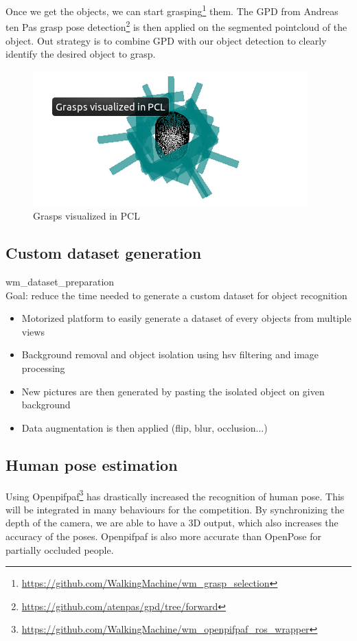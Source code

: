 \documentclass[runningheads,a4paper]{llncs}
\begin{document}
Once we get the objects, we can start grasping\footnote{\url{https://github.com/WalkingMachine/wm_grasp_selection}} them. The GPD from Andreas ten Pas grasp pose detection\footnote{\url{https://github.com/atenpas/gpd/tree/forward}} is then applied on the segmented pointcloud of the object. Out strategy is to combine GPD with our object detection to clearly identify the desired object to grasp. 
\begin{figure}
  \centering
  \includegraphics[width=300pt]{images/gpd2.png}
  \caption{Grasps visualized in PCL}
\end{figure}

\newpage
\subsection{Custom dataset generation}

wm\_dataset\_preparation\\

Goal: reduce the time needed to generate a custom dataset for object recognition\\
\begin{itemize}
  \item Motorized platform to easily generate a dataset of every objects from multiple views
  \item Background removal and object isolation using hsv filtering and image processing
  \item New pictures are then generated by pasting the isolated object on given background
  \item Data augmentation is then applied (flip, blur, occlusion...)
\end{itemize}
 
\subsection{Human pose estimation}
\tab Using Openpifpaf\footnote{\url{https://github.com/WalkingMachine/wm_openpifpaf_ros_wrapper}} has drastically increased the recognition of human pose. This will be integrated in many behaviours for the competition. By synchronizing the depth of the camera, we are able to have a 3D output, which also increases the accuracy of the poses. Openpifpaf is also more accurate than OpenPose for partially occluded people.\\
\end{document}
